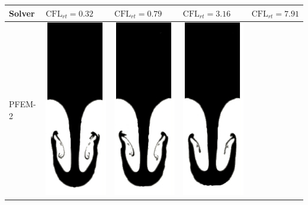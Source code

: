 \begin{table}[H]
\begin{center}
\begin{tabular}{m{} | >{\centering}m{} | >{\centering}m{} | >{\centering}m{} | m{} }
      Solver & $\textrm{CFL}_{rt}=0.32$ & $\textrm{CFL}_{rt}=0.79$ & $\textrm{CFL}_{rt}=3.16$ &$\textrm{CFL}_{rt}=7.91$ \\
      \hline
      PFEM-2 &
      \includegraphics[width=.17\columnwidth]{images/rayleigh_pfem_dts_A.jpg} &
      \includegraphics[width=.17\columnwidth]{images/rayleigh_pfem_dts_B.jpg} &
      \includegraphics[width=.17\columnwidth]{images/rayleigh_pfem_dts_C.jpg} &

\end{tabular}
\end{center}
\end{table}
